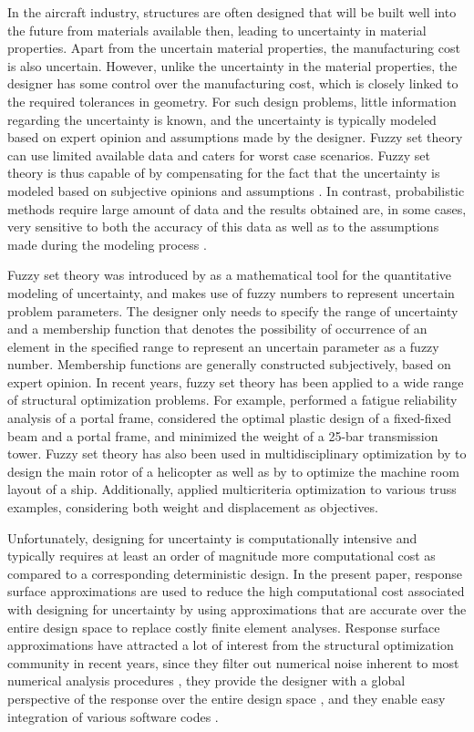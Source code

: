 \documentclass[stropt]{svjour}
\begin{document}
In the aircraft industry, structures are often designed that will be built
well into the future from materials available then, leading to uncertainty
in material properties.
Apart from the uncertain material properties, the manufacturing cost is also
uncertain.
However, unlike the uncertainty in the material properties, the designer has
some control over the manufacturing cost, which is closely linked to the
required tolerances in geometry.
For such design problems, little information regarding the uncertainty is
known, and the uncertainty is typically modeled based on expert opinion and
assumptions made by the designer.
Fuzzy set theory can use limited available data and caters for worst case
scenarios.
Fuzzy set theory is thus capable of by compensating for the fact that the
uncertainty is modeled based on subjective opinions and assumptions
\citep{Maglaras97}.
In contrast, probabilistic methods require large amount of data and the
results obtained are, in some cases, very sensitive to both the accuracy of
this data as well as to the assumptions made during the modeling process
\citep[e.g.][pp.~11--32]{BenHaim90}.

Fuzzy set theory was introduced by \citet{Zadeh65}
as a mathematical
tool for the quantitative modeling of uncertainty, and makes use of fuzzy
numbers to represent uncertain problem parameters.
The designer only needs to specify the range of uncertainty and a membership
function that denotes the possibility of occurrence of an element in the
specified range to represent an uncertain parameter as a fuzzy number.
Membership functions are generally constructed subjectively, based on
expert opinion.
In recent years, fuzzy set theory has been applied to a wide range of
structural optimization problems.
For example, \cite{Liu92}
performed a fatigue reliability
analysis of a portal frame, \cite{Jung96}
considered the
optimal plastic design of a fixed-fixed beam and a portal frame, and
\cite{Jensen97}
minimized the weight of a 25-bar transmission tower.
Fuzzy set theory has also been used in multidisciplinary optimization by
\cite{Rao93}
to design the main rotor of a helicopter as well as by
\cite{Wu96}
to optimize the machine room layout of a ship.
Additionally, \cite{Shih95}
applied multicriteria
optimization to various truss examples, considering both weight and
displacement as objectives.

Unfortunately, designing for uncertainty is computationally intensive and
typically requires at least an order of magnitude more computational cost as
compared to a corresponding deterministic design.
In the present paper, response surface approximations are used to reduce the
high computational cost associated with designing for uncertainty by using
approximations that are accurate over the entire design space to replace
costly finite element analyses.
Response surface approximations have attracted a lot of interest from the
structural optimization community in recent years, since they filter out
numerical noise inherent to most numerical analysis procedures
\citep[e.g.][]{Giunta94},
they provide the designer with a global
perspective of the response over the entire design space
\citep[e.g.][]{Mistree94},
and they enable easy integration of
various software codes \citep[e.g.][]{Kaufman96}.
\end{document}
